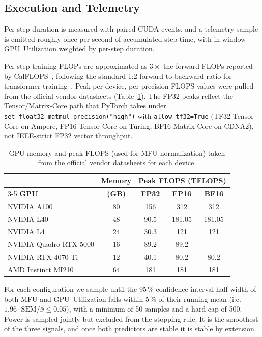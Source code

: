 \documentclass[10pt,conference,letterpaper]{IEEEtran}
\begin{document}
\subsection{Execution and Telemetry}\label{sec:execution}

Per-step duration is measured with paired CUDA events, and a telemetry sample is emitted roughly once per second of accumulated step time, with in-window GPU~Utilization weighted by per-step duration.

Per-step training FLOPs are approximated as $3\times$ the forward FLOPs reported by CalFLOPS~\cite{calflops}, following the standard 1:2 forward-to-backward ratio for transformer training~\cite{kaplan2020scaling}.
Peak per-device, per-precision FLOPS values were pulled from the official vendor datasheets (Table~\ref{tab:peak_flops}).
The FP32 peaks reflect the Tensor/Matrix-Core path that PyTorch takes under \texttt{set\_float32\_matmul\_precision("high")} with \texttt{allow\_tf32=True} (TF32 Tensor Core on Ampere, FP16 Tensor Core on Turing, BF16 Matrix Core on CDNA2), not IEEE-strict FP32 vector throughput.


\begin{table}[t]
    \centering
    \caption{GPU memory and peak FLOPS (used for MFU normalization) taken from the official vendor datasheets for each device.}
    \label{tab:peak_flops}
    \begin{tabular}{lcccc}
        \toprule
        & \textbf{Memory} & \multicolumn{3}{c}{\textbf{Peak FLOPS (TFLOPS)}} \\
        \cmidrule(lr){3-5}
        \textbf{GPU} & \textbf{(GB)} & \textbf{FP32} & \textbf{FP16} & \textbf{BF16} \\
        \midrule
        NVIDIA A100        & 80 & 156   & 312    & 312    \\
        NVIDIA L40         & 48 & 90.5  & 181.05 & 181.05 \\
        NVIDIA L4          & 24 & 30.3  & 121    & 121    \\
        NVIDIA Quadro RTX 5000 & 16 & 89.2  & 89.2   & ---    \\
        NVIDIA RTX 4070 Ti & 12 & 40.1  & 80.2   & 80.2   \\
        AMD Instinct MI210 & 64 & 181   & 181    & 181    \\
        \bottomrule
    \end{tabular}
\end{table}

For each configuration we sample until the 95\,\% confidence-interval half-width of both MFU and GPU~Utilization falls within 5\,\% of their running mean (i.e.\ $1.96 \cdot \text{SEM}/\bar{x} \le 0.05$), with a minimum of 50 samples and a hard cap of 500.
Power is sampled jointly but excluded from the stopping rule.
It is the smoothest of the three signals, and once both predictors are stable it is stable by extension.
\end{document}
